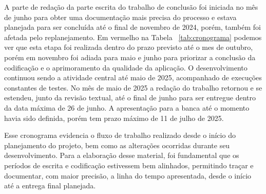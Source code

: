 A parte de redação da parte escrita do trabalho de conclusão foi iniciada 
no mês de junho para obter uma documentação mais precisa 
do processo e estava planejada para ser concluída até o final de novembro 
de 2024, porém, também foi afetada pelo replanejamento. Em vermelho na 
Tabela ~\ref{tab:cronograma} podemos ver que esta etapa foi realizada dentro 
do prazo previsto até o mes de outubro, porém em novembro foi adiada para maio 
e junho para priorizar a conclusão da codificação e o aprimoramento da qualidade 
da aplicação.
O desenvolvimento continuou sendo a atividade central até maio de 2025, acompanhado 
de execuções constantes de testes. No mês de maio de 2025 a redação do trabalho 
retornou e se estendeu, junto da revisão textual, até o final de junho para ser 
entregue dentro da data máxima de 26 de junho. A apresentação para a banca até o 
momento havia sido definida, porém tem prazo máximo de 11 de julho de 2025.

Esse cronograma evidencia o fluxo de trabalho realizado desde o início do 
planejamento do projeto, bem como as alterações ocorridas durante seu desenvolvimento. 
Para a elaboração desse material, foi fundamental que os períodos de escrita e codificação 
estivessem bem alinhados, permitindo traçar e documentar, com maior precisão, a linha do 
tempo apresentada, desde o início até a entrega final planejada.

